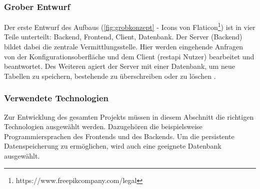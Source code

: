 \subsubsection{Grober Entwurf}
Der erste Entwurf des Aufbaus (\autoref{fig:grobkonzept} - Icons von Flaticon\footnote{https://www.freepikcompany.com/legal}) ist in vier Teile unterteilt: Backend, Frontend, Client, Datenbank. Der Server (Backend) bildet dabei die zentrale Vermittlungsstelle. Hier werden eingehende Anfragen von der Konfigurationsoberfläche und dem Client (\gls{restapi} Nutzer) bearbeitet und beantwortet. Des Weiteren agiert der Server mit einer Datenbank, um neue Tabellen zu speichern, bestehende zu überschreiben oder zu löschen . 

\subsubsection{Verwendete Technologien}
Zur Entwicklung des gesamten Projekts müssen in diesem Abschnitt die richtigen Technologien ausgewählt werden. Dazugehören die beispielsweise  Programmiersprachen des Frontends und des Backends. Um die persistente Datenspeicherung zu ermöglichen, wird auch eine geeignete Datenbank ausgewählt. \\
